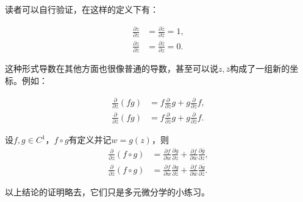 读者可以自行验证，在这样的定义下有：
\begin{proposition}
    \begin{align}
        \frac{\partial z}{\partial z}&=\frac{\partial \overline{z}}{\partial \overline{z}}=1,\\
        \frac{\partial z}{\partial \overline{z}}&=\frac{\partial \overline{z}}{\partial z}=0.
    \end{align}
\end{proposition}

这种形式导数在其他方面也很像普通的导数，甚至可以说$z,\overline{z}$构成了一组新的坐标。例如：
\begin{theorem}[Leibniz法则]
    \begin{align}
        \frac{\partial}{\partial z}(fg)&=f\frac{\partial}{\partial z}g+g\frac{\partial}{\partial z}f,\\
        \frac{\partial}{\partial \overline{z}}(fg)&=f\frac{\partial}{\partial \overline{z}}g+g\frac{\partial}{\partial \overline{z}}f.
    \end{align}
\end{theorem}
\begin{theorem}[链式法则]
    设$f,g\in C^1$，$f\circ g$有定义并记$w=g(z)$，则
    \begin{align}
        \frac{\partial}{\partial z}(f\circ g)&=\frac{\partial f}{\partial w}\frac{\partial g}{\partial z}+\frac{\partial f}{\partial \overline{w}}\frac{\partial\overline{g}}{\partial z},\\
        \frac{\partial}{\partial \overline{z}}(f\circ g)&=\frac{\partial f}{\partial w}\frac{\partial g}{\partial \overline{z}}+\frac{\partial f}{\partial \overline{w}}\frac{\partial\overline{g}}{\partial \overline{z}}.
    \end{align}
\end{theorem}
以上结论的证明略去，它们只是多元微分学的小练习。
